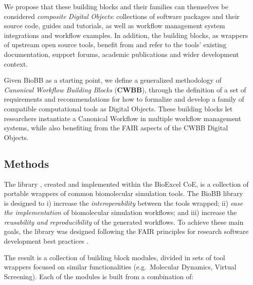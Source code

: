 We propose that these building blocks and their families can themselves
be considered \emph{composite Digital Objects}: collections of software
packages and their source code, guides and tutorials, as well as
workflow management system integrations and workflow examples. In
addition, the building blocks, as wrappers of upstream open source
tools, benefit from and refer to the tools' existing documentation,
support forums, academic publications and wider development context.

Given BioBB as a starting point, we define a generalized methodology of
\emph{Canonical Workflow Building Blocks} (\textbf{CWBB}), through the
definition of a set of requirements and recommendations for how to
formalize and develop a family of compatible computational tools as
Digital Objects. These building blocks let researchers instantiate a
Canonical Workflow in multiple workflow management systems, while also
benefiting from the FAIR aspects of the CWBB Digital Objects.

\subsection{Methods}\label{ch6:methods}

The 
library \cite{ch6-10}, created and implemented within the BioExcel CoE, is a
collection of portable wrappers of common biomolecular simulation tools.
The BioBB library is designed to i) increase the \emph{interoperability}
between the tools wrapped; ii) \emph{ease the implementation} of
biomolecular simulation workflows; and iii) increase the
\emph{reusability and reproducibility} of the generated workflows. To
achieve these main goals, the library was designed following the FAIR
principles for research software development best practices \cite{Lamprecht 2019}.

The result is a collection of building block modules, divided in sets of
tool wrappers focused on similar functionalities (e.g.~Molecular
Dynamics, Virtual Screening). Each of the modules is built from a
combination of:

